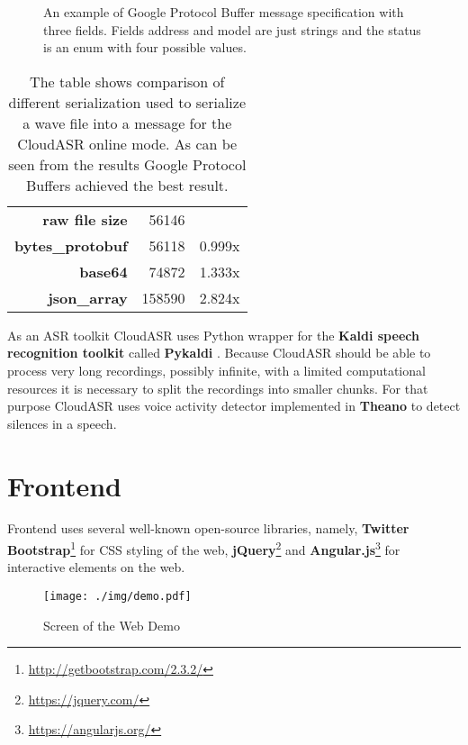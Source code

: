 \begin{figure}[h]
  

  \caption{
    An example of Google Protocol Buffer message specification with three fields.
    Fields address and model are just strings and the status is an enum with four possible values.
  }
  \label{fig:protobuf}
\end{figure}

\begin{table}[h]
  \begin{tabular}{rrl}
  \textbf{raw file size} & 56146 & \\
  \cline{1-3}
  \textbf{bytes\_protobuf} & 56118 & 0.999x \\
  \textbf{base64} & 74872 & 1.333x \\
  \textbf{json\_array} & 158590 & 2.824x \\
  \end{tabular}

  \caption{
    The table shows comparison of different serialization used to serialize a wave file into a message for the CloudASR online mode.
    As can be seen from the results Google Protocol Buffers achieved the best result.
  }
  \label{fig:protobuf-benchmark}
\end{table}

As an ASR toolkit CloudASR uses Python wrapper for the \textbf{Kaldi speech recognition toolkit} \cite{povey2011kaldi} called \textbf{Pykaldi} \cite{platek2014free}.
Because CloudASR should be able to process very long recordings, possibly infinite,
  with a limited computational resources
  it is necessary to split the recordings into smaller chunks.
For that purpose CloudASR uses voice activity detector implemented in \textbf{Theano} \cite{bergstra2010theano} to detect silences in a speech.


\section{Frontend}
Frontend uses several well-known open-source libraries, namely,
  \textbf{Twitter Bootstrap}\footnote{\url{http://getbootstrap.com/2.3.2/}} for CSS styling of the web,
  \textbf{jQuery}\footnote{\url{https://jquery.com/}}
  and \textbf{Angular.js}\footnote{\url{https://angularjs.org/}} for interactive elements on the web.

\begin{figure}[h]
  \centering
  \texttt{[image: ./img/demo.pdf]}

  \caption{Screen of the Web Demo}
  \label{fig:demo}
\end{figure}

